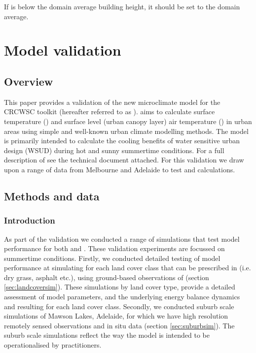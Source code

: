 \documentclass[final,3p,times,authoryear]{elsarticle}
\begin{document}
If  is below the domain average building height, it should be set to the domain average. 

\section{Model validation}\label{sec:validation}
\subsection{Overview}\label{sec:validationover}



This paper provides a validation of the new microclimate model for the CRCWSC toolkit (hereafter referred to as ).  aims to calculate surface temperature () and surface level (urban canopy layer) air temperature () in urban areas using simple and well-known urban climate modelling methods. The model is primarily intended to calculate the cooling benefits of water sensitive urban design (WSUD) during hot and sunny summertime conditions. For a full description of  see the technical document attached. For this validation we draw upon a range of data from Melbourne and Adelaide to test  and  calculations. 

\subsection{Methods and data}\label{sec:methods}
\subsubsection{Introduction}\label{sec:methodsintro}

As part of the validation we conducted a range of simulations that test model performance for both  and . These validation experiments are focussed on summertime conditions.  Firstly, we conducted detailed testing of model performance at simulating  for each land cover class that can be prescribed in  (i.e. dry grass, asphalt etc.), using ground-based observations of  (section \ref{sec:landcoversim}). These simulations by land cover type, provide a detailed assessment of model parameters, and the underlying energy balance dynamics and resulting  for each land cover class. Secondly, we conducted suburb scale simulations of Mawson Lakes, Adelaide, for which we have high resolution remotely sensed  observations and in situ  data (section \ref{sec:suburbsim}).  The suburb scale simulations reflect the way the model is intended to be operationalised by practitioners.
\end{document}

